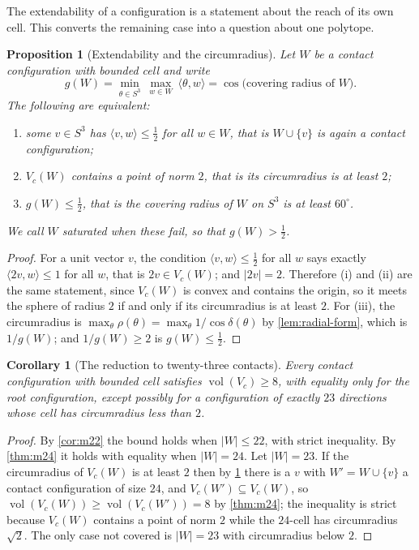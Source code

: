 \documentclass[11pt,reqno]{amsart}
\renewcommand{\_}{\origunderscore\allowbreak}
\numberwithin{equation}{section}
\theoremstyle{plain}
\newtheorem{prop}[thm]{Proposition}
\newtheorem{cor}[thm]{Corollary}
\theoremstyle{definition}
\theoremstyle{remark}
\DeclareMathOperator{\vol}{vol}
\begin{document}
The extendability of a configuration is a statement about the reach of
its own cell. This converts the remaining case into a question about one
polytope.

\begin{prop}[Extendability and the circumradius]\label{prop:extendable}
Let $W$ be a contact configuration with bounded cell and write
\[
  g(W)=\min_{\theta\in S^3}\ \max_{w\in W}\ \langle\theta,w\rangle
      =\cos\bigl(\text{covering radius of }W\bigr).
\]
The following are equivalent:
\begin{enumerate}[label=\textup{(\roman*)},leftmargin=2.2em]
\item some $v\in S^3$ has $\langle v,w\rangle\le\tfrac12$ for all $w\in
W$, that is $W\cup\{v\}$ is again a contact configuration;
\item $V_c(W)$ contains a point of norm $2$, that is its circumradius is
at least $2$;
\item $g(W)\le\tfrac12$, that is the covering radius of $W$ on $S^3$ is
at least $60^\circ$.
\end{enumerate}
We call $W$ \emph{saturated} when these fail, so that $g(W)>\tfrac12$.
\end{prop}

\begin{proof}
For a unit vector $v$, the condition $\langle v,w\rangle\le\tfrac12$ for
all $w$ says exactly $\langle 2v,w\rangle\le1$ for all $w$, that is
$2v\in V_c(W)$; and $|2v|=2$. Therefore (i) and (ii) are the same statement,
since $V_c(W)$ is convex and contains the origin, so it meets the sphere
of radius $2$ if and only if its circumradius is at least $2$. For (iii),
the circumradius is $\max_\theta\rho(\theta)=\max_\theta1/\cos\delta(\theta)$
by \cref{lem:radial-form}, which is $1/g(W)$; and $1/g(W)\ge2$ is
$g(W)\le\tfrac12$.
\end{proof}

\begin{cor}[The reduction to twenty-three contacts]\label{cor:remaining}
Every contact configuration with bounded cell satisfies $\vol(V_c)\ge8$, with equality only for the root
configuration, except possibly for a configuration of exactly $23$
directions whose cell has circumradius less than $2$.
\end{cor}

\begin{proof}
By \cref{cor:m22} the bound holds when $|W|\le22$, with strict
inequality. By \cref{thm:m24} it holds with equality when $|W|=24$. Let
$|W|=23$. If the circumradius of $V_c(W)$ is at least $2$ then by
\cref{prop:extendable} there is a $v$ with $W'=W\cup\{v\}$ a contact
configuration of size $24$, and $V_c(W')\subseteq V_c(W)$, so
$\vol(V_c(W))\ge\vol(V_c(W'))=8$ by \cref{thm:m24}; the inequality is
strict because $V_c(W)$ contains a point of norm $2$ while the $24$-cell
has circumradius $\sqrt2$. The only case not covered is $|W|=23$ with
circumradius below $2$.
\end{proof}
\end{document}

